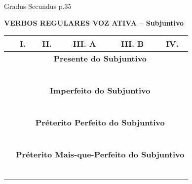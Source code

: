 \documentclass[12pt, oneside, a4paper, article]{article}
\begin{document}
\clearpage
Gradus Secundus p.35

\begin{table}[!hb]
\centering
\textbf{VERBOS REGULARES VOZ ATIVA -- Subjuntivo} 
\vspace{1 ex}

\begin{tabular}{|l|p{2.5cm}|p{2.5cm}|p{2.5cm}|p{2.5cm}|p{2.5cm}|} 
\hline \hline
& \multicolumn{1}{c|}{I.} & \multicolumn{1}{c|}{II.} & \multicolumn{1}{c|}{III. A} & \multicolumn{1}{c|}{III. B} & \multicolumn{1}{c|}{IV.}  \\
\hline

& \multicolumn{5}{c|}{\textbf{Presente do Subjuntivo}} \\
\hline
 &  &  &  &  &    \\ \hline
 &  &  &  &  &    \\ \hline
 &  &  &  &  &    \\ \hline
 &  &  &  &  &    \\ \hline
 &  &  &  &  &    \\ \hline
 &  &  &  &  &   \\ 
\hline \hline

& \multicolumn{5}{c|}{\textbf{Imperfeito do Subjuntivo}} \\
\hline
 &  &  &  &  &   \\ \hline
 &  &  &  &  &   \\ \hline
 &  &  &  &  &   \\ \hline
 &  &  &  &  &   \\ \hline
 &  &  &  &  &   \\ \hline
 &  &  &  &  &   \\ 
\hline \hline

& \multicolumn{5}{c|}{\textbf{Préterito Perfeito do Subjuntivo}} \\
\hline
 &  &  &  &  &   \\ \hline
 &  &  &  &  &   \\ \hline
 &  &  &  &  &   \\ \hline
 &  &  &  &  &   \\ \hline
 &  &  &  &  &   \\ \hline
 &  &  &  &  &   \\ 
\hline \hline

& \multicolumn{5}{c|}{\textbf{Préterito Mais-que-Perfeito do Subjuntivo}} \\
\hline
 &  &  &  &  &   \\ \hline
 &  &  &  &  &   \\ \hline
 &  &  &  &  &   \\ \hline
 &  &  &  &  &   \\ \hline
 &  &  &  &  &   \\ \hline
 &  &  &  &  &   \\ 
\hline \hline

\end{tabular}
\end{table}
\end{document}
